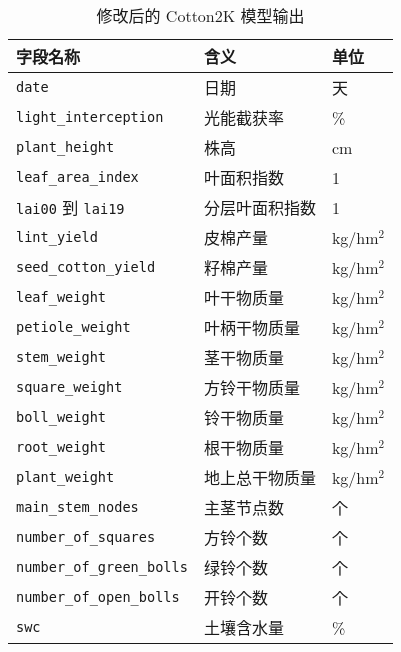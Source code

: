 \begin{table}
    \caption{修改后的 Cotton2K 模型输出}\label{tab:output}
    \centering
    \begin{tabular}{lll}
        \toprule
        字段名称                          & 含义           & 单位      \\
        \midrule
        \texttt{date}                     & 日期           & 天        \\
        \texttt{light\_interception}      & 光能截获率     & \%        \\
        \texttt{plant\_height}            & 株高           & cm        \\
        \texttt{leaf\_area\_index}        & 叶面积指数     & 1         \\
        \texttt{lai00} 到 \texttt{lai19}  & 分层叶面积指数 & 1         \\
        \texttt{lint\_yield}              & 皮棉产量       & kg/hm$^2$ \\
        \texttt{seed\_cotton\_yield}      & 籽棉产量       & kg/hm$^2$ \\
        \texttt{leaf\_weight}             & 叶干物质量     & kg/hm$^2$ \\
        \texttt{petiole\_weight}          & 叶柄干物质量   & kg/hm$^2$ \\
        \texttt{stem\_weight}             & 茎干物质量     & kg/hm$^2$ \\
        \texttt{square\_weight}           & 方铃干物质量   & kg/hm$^2$ \\
        \texttt{boll\_weight}             & 铃干物质量     & kg/hm$^2$ \\
        \texttt{root\_weight}             & 根干物质量     & kg/hm$^2$ \\
        \texttt{plant\_weight}            & 地上总干物质量 & kg/hm$^2$ \\
        \texttt{main\_stem\_nodes}        & 主茎节点数     & 个        \\
        \texttt{number\_of\_squares}      & 方铃个数       & 个        \\
        \texttt{number\_of\_green\_bolls} & 绿铃个数       & 个        \\
        \texttt{number\_of\_open\_bolls}  & 开铃个数       & 个        \\
        \texttt{swc}                      & 土壤含水量     & \%        \\
        \bottomrule
    \end{tabular}
\end{table}

